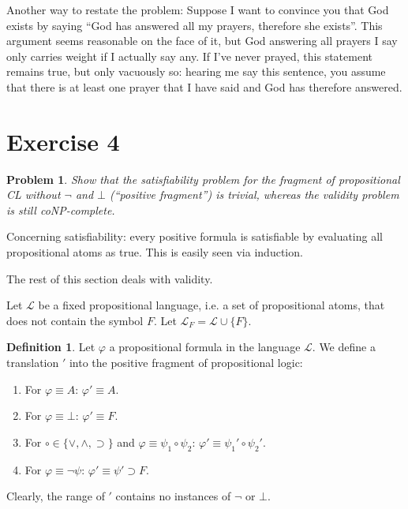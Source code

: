\documentclass[a4paper,10pt]{article}
\newcommand{\imp}{\supset}
\renewcommand{\L}{\mathcal{L}}
\newcommand{\Lf}{\L_F}
\newtheorem*{problem*}{Problem}
\theoremstyle{definition}
\newtheorem{definition}[theorem]{Definition}
\begin{document}
Another way to restate the problem: Suppose I want to convince you that God exists by saying ``God has answered all my prayers, therefore she exists''. This argument seems reasonable on the face of it, but God answering all prayers I say only carries weight if I actually say any. If I've never prayed, this statement remains true, but only vacuously so: hearing me say this sentence, you assume that there is at least one prayer that I have said and God has therefore answered.

\section*{Exercise 4}
\begin{problem*}
Show  that  the  satisfiability  problem  for  the  fragment  of  propositional CL without $¬$ and $\bot$ (``positive fragment'') is trivial, whereas the validity problem is still coNP-complete.
\end{problem*}

Concerning satisfiability: every positive formula is satisfiable by evaluating all propositional atoms as true. This is easily seen via induction.

The rest of this section deals with validity.

Let $\L$ be a fixed propositional language, i.e. a set of propositional atoms, that does not contain the symbol $F$. Let $\Lf = \L ∪ \{F\}$.
\begin{definition}
 Let $φ$ a propositional formula in the language $\L$. We define a translation $'$ into the positive fragment of propositional logic:
 \begin{enumerate}
  \item For $φ \equiv A$: $φ' \equiv A$.
  \item For $φ \equiv \bot$: $φ' \equiv F$.
  \item For $\circ \in \{∨,∧,\imp\}$ and $φ \equiv ψ_1 \circ ψ_2$: $φ' \equiv ψ_1' \circ ψ_2'$.
  \item For $φ \equiv ¬ψ$: $φ' \equiv ψ' \imp F$.
 \end{enumerate}
\end{definition}

Clearly, the range of $'$ contains no instances of $¬$ or $\bot$.
\end{document}
